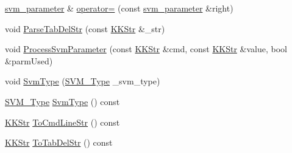 \begin{DoxyCompactItemize}
\item 
\hyperlink{struct_s_v_m289___m_f_s_1_1svm__parameter}{svm\+\_\+parameter} \& \hyperlink{struct_s_v_m289___m_f_s_1_1svm__parameter_aeda34fdacae4244f4280315f4fb5e0c5}{operator=} (const \hyperlink{struct_s_v_m289___m_f_s_1_1svm__parameter}{svm\+\_\+parameter} \&right)
\item 
void \hyperlink{struct_s_v_m289___m_f_s_1_1svm__parameter_adb063e5121b891b0b02b3ef73e93aeff}{Parse\+Tab\+Del\+Str} (const \hyperlink{class_k_k_b_1_1_k_k_str}{K\+K\+Str} \&\+\_\+str)
\item 
void \hyperlink{struct_s_v_m289___m_f_s_1_1svm__parameter_a65b9e32cce80bcb3ed3e95e8bdbf8d4b}{Process\+Svm\+Parameter} (const \hyperlink{class_k_k_b_1_1_k_k_str}{K\+K\+Str} \&cmd, const \hyperlink{class_k_k_b_1_1_k_k_str}{K\+K\+Str} \&value, bool \&parm\+Used)
\item 
void \hyperlink{struct_s_v_m289___m_f_s_1_1svm__parameter_acf7b4257d776af2f508966ff1d584b26}{Svm\+Type} (\hyperlink{namespace_s_v_m289___m_f_s_ace392faef6440cf56ebff6b360e7d72a}{S\+V\+M\+\_\+\+Type} \+\_\+svm\+\_\+type)
\item 
\hyperlink{namespace_s_v_m289___m_f_s_ace392faef6440cf56ebff6b360e7d72a}{S\+V\+M\+\_\+\+Type} \hyperlink{struct_s_v_m289___m_f_s_1_1svm__parameter_a7630ebfbf42c0b8cd3d93cfcec66af79}{Svm\+Type} () const 
\item 
\hyperlink{class_k_k_b_1_1_k_k_str}{K\+K\+Str} \hyperlink{struct_s_v_m289___m_f_s_1_1svm__parameter_aa452d9976e7c1da9362538a758eb7837}{To\+Cmd\+Line\+Str} () const 
\item 
\hyperlink{class_k_k_b_1_1_k_k_str}{K\+K\+Str} \hyperlink{struct_s_v_m289___m_f_s_1_1svm__parameter_ad3699cafbed5bd49a345b4be3ffe65a8}{To\+Tab\+Del\+Str} () const 
\end{DoxyCompactItemize}
